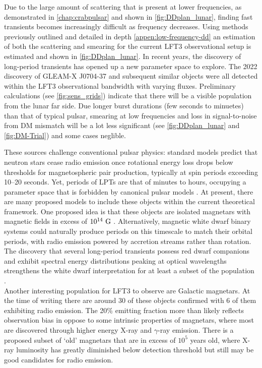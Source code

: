 Due to the large amount of scattering that is present at lower frequencies, as demonstrated in \cref{chap:crabpulsar} and shown in \cref{fig:DDplan_lunar}, finding fast transients becomes increasingly difficult as frequency decreases. Using methods previously outlined and detailed in depth \cref{appen:low-frequency-dd} an estimation of both the scattering and smearing for the current LFT3 observational setup is estimated and shown in \cref{fig:DDplan_lunar}. In recent years, the discovery of long-period transients has opened up a new parameter space to explore. The 2022 discovery of GLEAM-X J0704-37 \citep{hurley-walker_radio_2022} and subsequent similar objects \citep{bloot_strongly_2025, men_highly_2025, wang_detection_2025} were all detected within the LFT3 observational bandwidth with varying fluxes. Preliminary calculations (see \cref{fig:sens_grids}) indicate that there will be a visible population from the lunar far side. Due longer burst durations (few seconds to minuetes) than that of typical pulsar, smearing at low frequencies and loss in signal-to-noise from DM mismatch will be a lot less significant (see \cref{fig:DDplan_lunar} and \cref{fig:DM-Trial}) and some cases neglible.  



These sources challenge conventional pulsar physics: standard models predict that neutron stars cease radio emission once rotational energy loss drops below thresholds for magnetospheric pair production, typically at spin periods exceeding 10–20 seconds. Yet, periods of LPTs are that of minutes to hours, occupying a parameter space that is forbidden by canonical pulsar models \cite{pulsar_handbook}. At present, there are many proposed models to include these objects within the current theoretical framework. One proposed idea is that these objects are isolated magnetars with magnetic fields in excess of $10^{14}~\rm G$ \cite{men_highly_2025}. Alternatively, magnetic white dwarf binary systems could naturally produce periods on this timescale to match their orbital periods, with radio emission powered by accretion streams rather than rotation. The discovery that several long-period transients possess red dwarf companions and exhibit spectral energy distributions peaking at optical wavelengths strengthens the white dwarf interpretation for at least a subset of the population \cite{de_ruiter_sporadic_2025, pelisoli_constraints_2025}. \\ 

Another interesting population for LFT3 to observe are Galactic magnetars. At the time of writing there are around 30 of these objects confirmed with 6 of them exhibiting radio emission. The 20\% emitting fraction more than likely reflects observation bias in oppose to some intrinsic properties of magnetars, where most are discovered through higher energy X-ray and $\gamma$-ray emission. There is a proposed subset of `old' magnetars that are in excess of $10^{5}$ years old, where X-ray luminosity has greatly diminished below detection threshold but still may be good candidates for radio emission. \\ 

